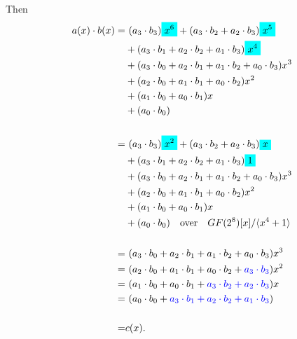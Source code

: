 Then \begin{align*}
	a(x)\cdot b(x) =&\ (a_3\cdot b_3)\mathcolorbox{-red}{x^6} + (a_3\cdot b_2+a_2\cdot b_3)\mathcolorbox{-red}{x^5} \\
	& +(a_3\cdot b_1 + a_2\cdot b_2 + a_1\cdot b_3)\mathcolorbox{-red}{x^4} \\
	& +(a_3\cdot b_0 + a_2\cdot b_1 + a_1\cdot b_2 + a_0\cdot b_3)x^3 \\
	& +(a_2\cdot b_0 + a_1\cdot b_1 + a_0\cdot b_2)x^2 \\
	& +(a_1\cdot b_0 + a_0\cdot b_1)x \\
	& +(a_0\cdot b_0) \\
	\\
	=&\ (a_3\cdot b_3)\mathcolorbox{-red}{x^2} + (a_3\cdot b_2+a_2\cdot b_3)\mathcolorbox{-red}{x} \\
	& +(a_3\cdot b_1 + a_2\cdot b_2 + a_1\cdot b_3)\mathcolorbox{-red}{1} \\
	& +(a_3\cdot b_0 + a_2\cdot b_1 + a_1\cdot b_2 + a_0\cdot b_3)x^3 \\
	& +(a_2\cdot b_0 + a_1\cdot b_1 + a_0\cdot b_2)x^2 \\
	& +(a_1\cdot b_0 + a_0\cdot b_1)x \\
	& +(a_0\cdot b_0)\quad\text{over}\quad GF(2^8)[x]/\gen{x^4+1} \\
	\\
	=&\ (a_3\cdot b_0 + a_2\cdot b_1 + a_1\cdot b_2 + a_0\cdot b_3)x^3 \\
	=&\ (a_2\cdot b_0 + a_1\cdot b_1 + a_0\cdot b_2 + \textcolor{blue}{a_3\cdot b_3})x^2 \\
	=&\ (a_1\cdot b_0 + a_0\cdot b_1 + \textcolor{blue}{a_3\cdot b_2 + a_2\cdot b_3})x \\
	=&\ (a_0\cdot b_0 + \textcolor{blue}{a_3\cdot b_1 + a_2\cdot b_2 + a_1\cdot b_3}) \\
	\\
	=& c(x).
\end{align*}

